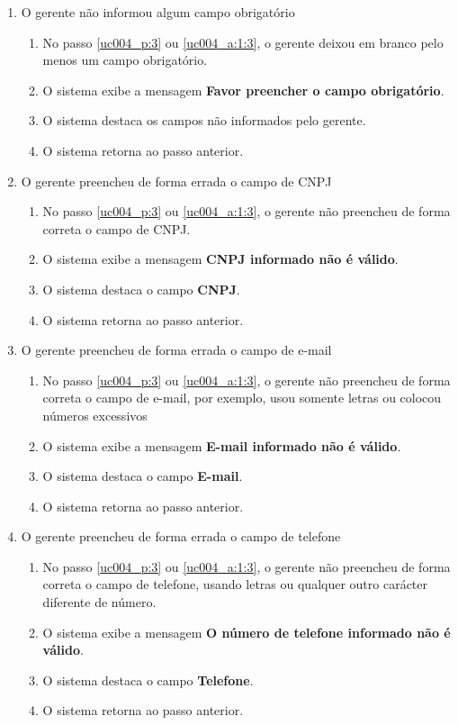 \begin{enumerate}[label=E\arabic*]	
	\item O gerente não informou algum campo obrigatório \label{uc004_e:1}
	\begin{enumerate}[label*=.\arabic*]
		\item[] No passo \ref{uc004_p:3} ou \ref{uc004_a:1:3}, o gerente deixou em branco pelo menos um campo obrigatório.
		\item O sistema exibe a mensagem \textbf{Favor preencher o campo obrigatório}.
		\item O sistema destaca os campos não informados pelo gerente.
		\item O sistema retorna ao passo anterior.
	\end{enumerate}
	
	\item O gerente preencheu de forma errada o campo de CNPJ \label{uc004_e:2}
	\begin{enumerate}[label*=.\arabic*]		
		\item[] No passo \ref{uc004_p:3} ou \ref{uc004_a:1:3}, o gerente não preencheu de forma correta o campo de CNPJ.		
		\item O sistema exibe a mensagem \textbf{CNPJ informado não é válido}.
		\item O sistema destaca o campo \textbf{CNPJ}.
		\item O sistema retorna ao passo anterior.
	\end{enumerate}
	
	\item O gerente preencheu de forma errada o campo de e-mail \label{uc004_e:3}
	\begin{enumerate}[label*=.\arabic*]		
		\item[] No passo \ref{uc004_p:3} ou \ref{uc004_a:1:3}, o gerente não preencheu de forma correta o campo de e-mail, por exemplo, usou somente letras ou colocou números excessivos	
		\item O sistema exibe a mensagem \textbf{E-mail informado não é válido}.
		\item O sistema destaca o campo \textbf{E-mail}.
		\item O sistema retorna ao passo anterior.
	\end{enumerate}
	
	\item O gerente preencheu de forma errada o campo de telefone \label{uc004_e:4}
	\begin{enumerate}[label*=.\arabic*]		
		\item[] No passo \ref{uc004_p:3} ou \ref{uc004_a:1:3}, o gerente não preencheu de forma correta o campo de telefone, usando letras ou qualquer outro carácter diferente de número.		
		\item O sistema exibe a mensagem \textbf{O número de telefone informado não é válido}.
		\item O sistema destaca o campo \textbf{Telefone}.
		\item O sistema retorna ao passo anterior.
	\end{enumerate}
	

\end{enumerate}
